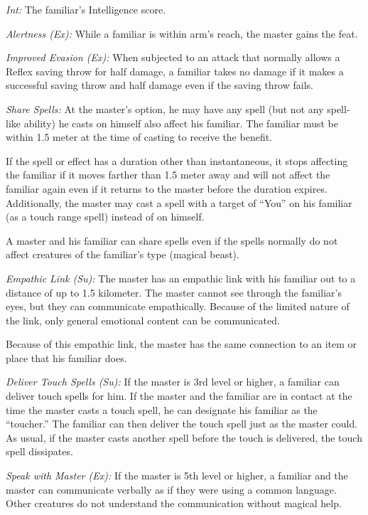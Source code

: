 \textit{Int:} The familiar's Intelligence score.

\textit{Alertness (Ex):} While a familiar is within arm's reach, the master gains the  feat.

\textit{Improved Evasion (Ex):} When subjected to an attack that normally allows a Reflex saving throw for half damage, a familiar takes no damage if it makes a successful saving throw and half damage even if the saving throw fails.

\textit{Share Spells:} At the master's option, he may have any spell (but not any spell-like ability) he casts on himself also affect his familiar. The familiar must be within 1.5 meter at the time of casting to receive the benefit.

If the spell or effect has a duration other than instantaneous, it stops affecting the familiar if it moves farther than 1.5 meter away and will not affect the familiar again even if it returns to the master before the duration expires. Additionally, the master may cast a spell with a target of ``You'' on his familiar (as a touch range spell) instead of on himself.

A master and his familiar can share spells even if the spells normally do not affect creatures of the familiar's type (magical beast).

\textit{Empathic Link (Su):} The master has an empathic link with his familiar out to a distance of up to 1.5 kilometer. The master cannot see through the familiar's eyes, but they can communicate empathically. Because of the limited nature of the link, only general emotional content can be communicated.

Because of this empathic link, the master has the same connection to an item or place that his familiar does.

\textit{Deliver Touch Spells (Su):} If the master is 3rd level or higher, a familiar can deliver touch spells for him. If the master and the familiar are in contact at the time the master casts a touch spell, he can designate his familiar as the ``toucher.'' The familiar can then deliver the touch spell just as the master could. As usual, if the master casts another spell before the touch is delivered, the touch spell dissipates.

\textit{Speak with Master (Ex):} If the master is 5th level or higher, a familiar and the master can communicate verbally as if they were using a common language. Other creatures do not understand the communication without magical help.

